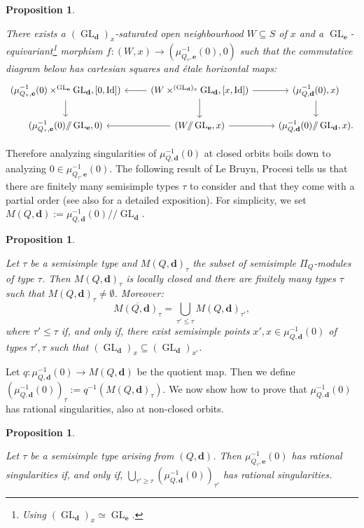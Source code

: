 \documentclass[11pt,english]{article}
\numberwithin{equation}{section}
\numberwithin{figure}{section}
\theoremstyle{definition}
\theoremstyle{plain}
\newtheorem{prop}[df]{Proposition}
\theoremstyle{remark}
\DeclareMathOperator{\Id}{Id}
\DeclareMathOperator{\GL}{GL}
\newcommand\dd{\mathbf{d}}
\newcommand\ee{\mathbf{e}}
\newcommand\git{/\!\!/}
\begin{document}
\begin{prop}{\cite[\S 4.]{CB03a} \cite[Thm. 2.9.]{Bud21}} \label{Prop/MomMapEtSlice}

There exists a $(\GL_{\dd})_{x}$-saturated open neighbourhood $W\subseteq S$
of $x$ and a $\GL_{\ee}$-equivariant\footnote{Using $(\GL_{\dd})_{x}\simeq\GL_{\ee}$.}
morphism $f:(W,x)\rightarrow(\mu_{Q_{\tau},\ee}^{-1}(0),0)$ such
that the commutative diagram below has cartesian squares and étale
horizontal maps:\[
\begin{tikzcd}[ampersand replacement = \&]
(\mu_{Q_{\tau},\ee}^{-1}(0)\times^{\GL_{\ee}}\GL_{\dd},[0,\Id]) \ar[d] \& (W\times^{(\GL_{\dd})_x}\GL_{\dd},[x,\Id]) \ar[l]\ar[r]\ar[d] \& (\mu_{Q,\dd}^{-1}(0),x) \ar[d] \\
(\mu_{Q_{\tau},\ee}^{-1}(0)\git\GL_{\ee},0) \& (W\git\GL_{\ee},x) \ar[l]\ar[r] \& (\mu_{Q,\dd}^{-1}(0)\git\GL_{\dd},x).
\end{tikzcd}
\]\end{prop}

Therefore analyzing singularities of $\mu_{Q,\dd}^{-1}(0)$ at closed
orbits boils down to analyzing $0\in\mu_{Q_{\tau},\ee}^{-1}(0)$.
The following result of Le Bruyn, Procesi \cite{LBP90} tells us that
there are finitely many semisimple types $\tau$ to consider and that
they come with a partial order (see also \cite[\S2.]{Bud21} for a
detailed exposition). For simplicity, we set $M(Q,\dd):=\mu_{Q,\dd}^{-1}(0)\git\GL_{\dd}$.

\begin{prop}{\cite[Thm. 2.2.]{Bud21}} \label{Prop/QuotStrat}

Let $\tau$ be a semisimple type and $M(Q,\dd)_{\tau}$ the subset
of semisimple $\Pi_{Q}$-modules of type $\tau$. Then $M(Q,\dd)_{\tau}$
is locally closed and there are finitely many types $\tau$ such that
$M(Q,\dd)_{\tau}\ne\emptyset$. Moreover:\[
\overline{M(Q,\dd)_{\tau}}=\bigcup_{\tau'\leq\tau}M(Q,\dd)_{\tau'},
\]where $\tau'\leq\tau$ if, and only if, there exist semisimple points
$x',x\in\mu_{Q,\dd}^{-1}(0)$ of types $\tau',\tau$ such that $(\GL_{\dd})_{x}\subseteq(\GL_{\dd})_{x'}$.

\end{prop}

Let $q:\mu_{Q,\dd}^{-1}(0)\rightarrow M(Q,\dd)$ be the quotient map.
Then we define $\left(\mu_{Q,\dd}^{-1}(0)\right)_{\tau}:=q^{-1}(M(Q,\dd)_{\tau})$.
We now show how to prove that $\mu_{Q,\dd}^{-1}(0)$ has rational
singularities, also at non-closed orbits.

\begin{prop} \label{Prop/RatSgClosedOrb}

Let $\tau$ be a semisimple type arising from $(Q,\dd)$. Then $\mu_{Q_{\tau},\ee}^{-1}(0)$
has rational singularities if, and only if, $\bigcup_{\tau'\geq\tau}\left(\mu_{Q,\dd}^{-1}(0)\right)_{\tau'}$
has rational singularities.

\end{prop}
\end{document}
